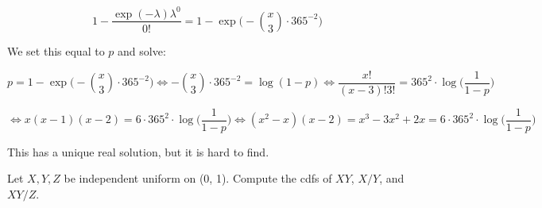 \begin{enumerate}[(a)]
\[
1 - \frac{\exp(-\lambda) \lambda^0}{0!} = 1 - \exp \bigg(-\binom{x}{3} \cdot 365^{-2} \bigg)
\]

We set this equal to \(p\) and solve:

\[
p = 1 - \exp \bigg(-\binom{x}{3} \cdot 365^{-2} \bigg) \iff -\binom{x}{3} \cdot 365^{-2}  = \log(1-p) \iff \frac{x!}{(x-3)!3!} = 365^2 \cdot \log \bigg(\frac{1}{1-p} \bigg)
\]

\[
\iff x(x-1)(x-2) = 6 \cdot 365^2 \cdot \log \bigg(\frac{1}{1-p} \bigg) \iff (x^2-x)(x-2) =  x^3 - 3x^2 + 2x = 6 \cdot 365^2 \cdot \log \bigg(\frac{1}{1-p} \bigg) 
\]

This has a unique real solution, but it is hard to find.

\end{enumerate}



\begin{exercise}

Let \(X, Y, Z\) be independent uniform on (0, 1). Compute the cdfs of \(XY\), \(X/Y\), and \(XY/Z\). 

\end{exercise}

